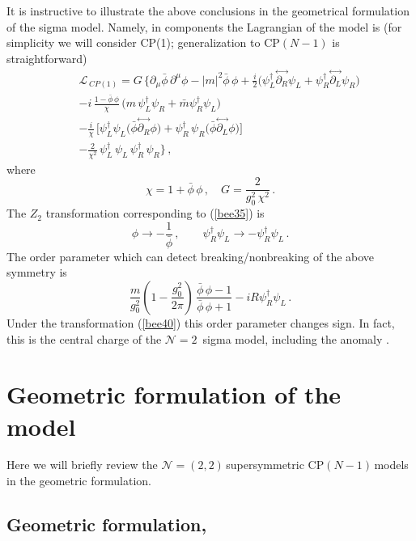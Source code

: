 \documentclass[epsfig,12pt]{article}
\def\beq{\begin{equation}}
\def\eeq{\end{equation}}
\def\beqn{\begin{eqnarray}}
\def\eeqn{\end{eqnarray}}
\newcommand{\ntwo}{${\mathcal N}=2\,$}
\newcommand{\ntt}{${\mathcal N}=(2,2)\,$}
\newcommand{\cpn}{CP$(N-1)\,$}
\renewcommand{\theequation}{\thesection.\arabic{equation}}
\def\beqn{\begin{eqnarray}}
\def\eeqn{\end{eqnarray}}
\def\beq{\begin{equation}}
\def\eeq{\end{equation}}
\renewcommand{\theequation}{\thesection.\arabic{equation}}
\begin{document}
{It is instructive to illustrate the above conclusions
in  the geometrical  formulation of the sigma model. 
Namely, in components the Lagrangian of the model is
(for simplicity we will consider CP(1); generalization to CP$(N-1)$ is straightforward)
\beqn
&&
{\mathcal L}_{\,  CP(1)}= G\, \Big\{
\partial_\mu \bar{\phi}\, \partial^\mu\phi -|m|^2{\bar{\phi}\,\phi} 
+\frac{i}{2}\big(\psi_L^\dagger\!\stackrel{\leftrightarrow}{\partial_R}\!\psi_L 
+ \psi_R^\dagger\!\stackrel{\leftrightarrow}{\partial_L}\!\psi_R
\big)
\nonumber\\[1mm] 
&&
-i\,\frac{1-\bar{\phi}\,\phi}{\chi} \,\big(m\,\psi_L^\dagger \psi_R + \bar m
\psi_R^\dagger \psi_L
\big)
\nonumber\\[1mm] 
&&
-\frac{i}{\chi}\,  \big[\psi_L^\dagger \psi_L
\big(\bar{\phi} \!\stackrel{\leftrightarrow}{\partial_R}\!\phi
\big)+ \psi_R^\dagger\, \psi_R
\big(\bar{\phi}\!\stackrel{\leftrightarrow}{\partial_L}\!\phi
\big)
\big]
\nonumber\\[1mm]
&&
-
\frac{2}{\chi^2}\,\psi_L^\dagger\,\psi_L \,\psi_R^\dagger\,\psi_R
\Big\}\,,
\label{Aone}
\eeqn
where 
\beq
\chi = 1+\bar{\phi}\,\phi\,,\quad G= \frac{2}{g_0^2\,\chi^2}\,.
\eeq
The $Z_2$ transformation corresponding to (\ref{bee35}) is
\beq
\phi \to -\frac{1}{\bar{\phi}}\,,\qquad \psi_R^\dagger \psi_L\to -
\psi_R^\dagger \psi_L\,.
\label{bee40}
\eeq
 The order parameter which can detect breaking/nonbreaking of the above
symmetry is
\beq
\frac{m}{g_0^2} \left(1- \frac{g_0^2}{2\pi}
\right)\, \frac{\bar{\phi}\,\phi-1}{\bar{\phi}\,\phi+1} - 
i R \psi_R^\dagger \psi_L\,.
\eeq
Under the transformation (\ref{bee40}) this order parameter changes sign.
In fact, this is  the central charge of the \ntwo
sigma model, including the anomaly  \cite{ls,ls1}.


\section{Geometric formulation of the model}
 \renewcommand{\theequation}{\Alph{section}.\arabic{equation}}
\setcounter{equation}{0}
 \renewcommand{\thesubsection}{\Alph{section}.\arabic{subsection}}
\setcounter{subsection}{0}
\label{app:geom}

Here we will  briefly review the \ntt supersymmetric \cpn models in the
geometric formulation. 

\subsection{Geometric formulation,  }

}
\end{document}
